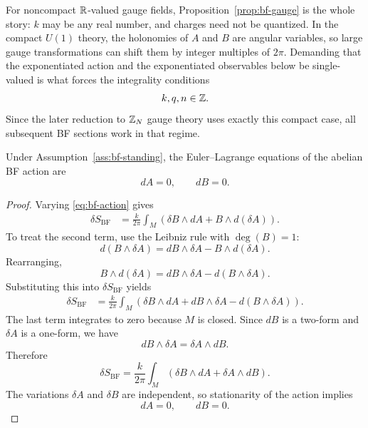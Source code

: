 \begin{remark}\label{rem:bf-compact}
For noncompact $\mathbb{R}$-valued gauge fields, Proposition~\ref{prop:bf-gauge} is the whole story: $k$ may be any real number, and charges need not be quantized. In the compact $U(1)$ theory, the holonomies of $A$ and $B$ are angular variables, so large gauge transformations can shift them by integer multiples of $2\pi$. Demanding that the exponentiated action and the exponentiated observables below be single-valued is what forces the integrality conditions
\begin{equation*}
k,q,n \in \mathbb{Z}.
\end{equation*}
Since the later reduction to $\mathbb{Z}_N$ gauge theory uses exactly this compact case, all subsequent BF sections work in that regime.
\end{remark}

\begin{proposition}\label{prop:bf-eom}
Under Assumption~\ref{ass:bf-standing}, the Euler--Lagrange equations of the abelian BF action are
\begin{equation}\label{eq:bf-eom}
dA = 0,
\qquad
dB = 0.
\end{equation}
\end{proposition}

\begin{proof}
Varying \eqref{eq:bf-action} gives
\begin{align*}
\delta S_{\mathrm{BF}}
&=
\frac{k}{2\pi}\int_M \left(\delta B\wedge dA + B\wedge d(\delta A)\right).
\end{align*}
To treat the second term, use the Leibniz rule with $\deg(B)=1$:
\begin{equation*}
d(B\wedge \delta A)=dB\wedge \delta A - B\wedge d(\delta A).
\end{equation*}
Rearranging,
\begin{equation*}
B\wedge d(\delta A)=dB\wedge \delta A - d(B\wedge \delta A).
\end{equation*}
Substituting this into $\delta S_{\mathrm{BF}}$ yields
\begin{align*}
\delta S_{\mathrm{BF}}
&=
\frac{k}{2\pi}\int_M \left(\delta B\wedge dA + dB\wedge \delta A - d(B\wedge \delta A)\right).
\end{align*}
The last term integrates to zero because $M$ is closed. Since $dB$ is a two-form and $\delta A$ is a one-form, we have
\begin{equation*}
dB\wedge \delta A = \delta A \wedge dB.
\end{equation*}
Therefore
\begin{equation}\label{eq:bf-variation}
\delta S_{\mathrm{BF}}
=
\frac{k}{2\pi}\int_M \left(\delta B\wedge dA + \delta A\wedge dB\right).
\end{equation}
The variations $\delta A$ and $\delta B$ are independent, so stationarity of the action implies
\begin{equation*}
dA=0,
\qquad
dB=0.
\end{equation*}
\end{proof}

